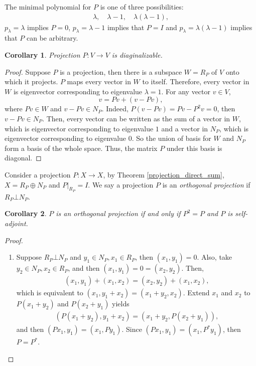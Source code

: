 \documentclass[10pt]{book}
\newtheorem{corollary}{Corollary}[theorem]
\theoremstyle{definition}
\numberwithin{equation}{chapter}
\begin{document}
\begin{subappendices}
The minimal polynomial for $P$ is one of three possibilities:
\begin{align*}
    \lambda, \quad \lambda - 1, \quad \lambda(\lambda - 1),
\end{align*}
$p_\lambda = \lambda$ implies $P = 0$, $p_\lambda = \lambda - 1$ implies that $P = I$ and $p_\lambda = \lambda(\lambda - 1)$ implies that $P$ can be arbitrary. 

\medskip

\begin{corollary}{\rm \cite{33}}
Projection $P: V \to V$ is diaginalizable.
\end{corollary}
\begin{proof}
Suppose $P$ is a projection, then there is a subspace $W = R_P$ of $V$ onto which it projects. $P$ maps every vector in $W$ to itself. Therefore, every vector in $W$ is eigenvector corresponding to eigenvalue $\lambda = 1$. For any vector $v \in V$, 
$$v = Pv + (v - Pv),$$ 
where $Pv \in W$ and $v - Pv \in N_P$. Indeed, $P(v - Pv) = Pv - P^2 v = 0$, then $v - Pv \in N_P$. Then, every vector can be written as the sum of a vector in $W$, which is eigenvector corresponding to eigenvalue $1$ and a vector in $N_P$, which is eigenvector corresponding to eigenvalue $0$. So the union of basis for $W$ and $N_P$ form a basis of the whole space. Thus, the matrix $P$ under this basis is diagonal.
\end{proof}

\medskip

Consider a projection $P: X \to X$, by Theorem \ref{projection_direct_sum}, $X = R_P \oplus N_P$ and $P|_{R_P} = I$. We say a projection $P$ is an {\em orthogonal projection} if $R_P \bot N_P$.

\medskip

\begin{corollary}\label{coro_10322}
$P$ is an orthogonal projection if and only if $P^2 = P$ and $P$ is self-adjoint.
\end{corollary}
\begin{proof}
~\begin{enumerate}[label=(\alph*)]
    \item Suppose $R_P \bot N_P$ and $y_1 \in N_P, x_1 \in R_P$, then $(x_1, y_1) = 0$. Also, take $y_2 \in N_P, x_2 \in R_P$, and then $(x_1, y_1) = 0 = (x_2, y_2)$. Then,
    \begin{align*}
        (x_1, y_1) + (x_1, x_2) = (x_2, y_2) + (x_1, x_2),
    \end{align*}
    which is equivalent to $(x_1, y_1 + x_2) = (x_1 + y_2, x_2)$. Extend $x_1$ and $x_2$ to $P(x_1 + y_2)$ and $P(x_2 + y_1)$\cite{34} yields 
    \begin{align*}
        (P(x_1 + y_2), y_1 + x_2) = (x_1 + y_2, P(x_2 + y_1)),
    \end{align*}
    and then $(Px_1, y_1) = (x_1, Py_1)$. Since $(Px_1, y_1) = (x_1, P^*y_1)$, then $P = P^*$.
    

\end{enumerate}
\end{proof}
\end{subappendices}
\end{document}
